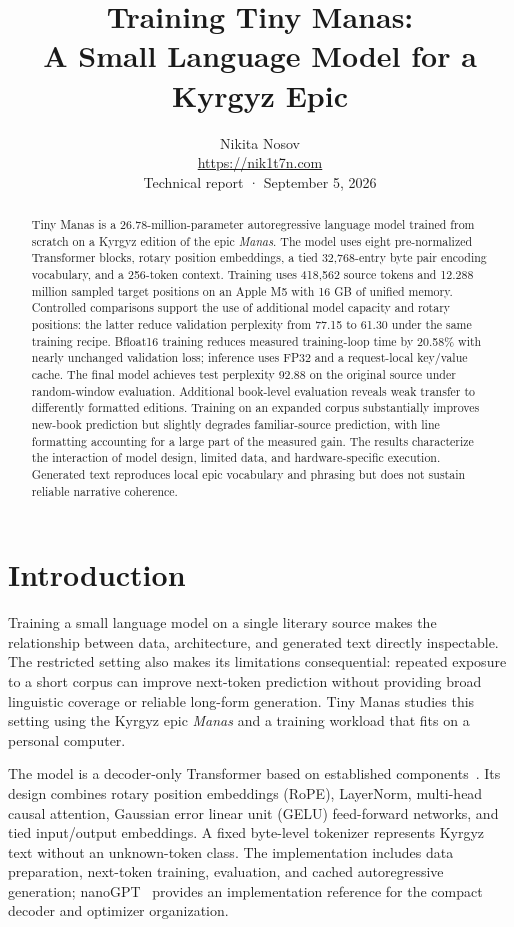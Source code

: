 \documentclass{article}
\title{Training Tiny Manas:\\A Small Language Model for a Kyrgyz Epic}
\author{Nikita Nosov\\\url{https://nik1t7n.com}\\\small Technical report · September 5, 2026}
\date{}
\begin{document}
\maketitle

\begin{abstract}
Tiny Manas is a 26.78-million-parameter autoregressive language model trained from scratch on a Kyrgyz edition of the epic \emph{Manas}. The model uses eight pre-normalized Transformer blocks, rotary position embeddings, a tied 32,768-entry byte pair encoding vocabulary, and a 256-token context. Training uses 418,562 source tokens and 12.288 million sampled target positions on an Apple M5 with 16 GB of unified memory. Controlled comparisons support the use of additional model capacity and rotary positions: the latter reduce validation perplexity from 77.15 to 61.30 under the same training recipe. Bfloat16 training reduces measured training-loop time by 20.58\% with nearly unchanged validation loss; inference uses FP32 and a request-local key/value cache. The final model achieves test perplexity 92.88 on the original source under random-window evaluation. Additional book-level evaluation reveals weak transfer to differently formatted editions. Training on an expanded corpus substantially improves new-book prediction but slightly degrades familiar-source prediction, with line formatting accounting for a large part of the measured gain. The results characterize the interaction of model design, limited data, and hardware-specific execution. Generated text reproduces local epic vocabulary and phrasing but does not sustain reliable narrative coherence.
\end{abstract}

\section{Introduction}
Training a small language model on a single literary source makes the relationship between data, architecture, and generated text directly inspectable. The restricted setting also makes its limitations consequential: repeated exposure to a short corpus can improve next-token prediction without providing broad linguistic coverage or reliable long-form generation. Tiny Manas studies this setting using the Kyrgyz epic \emph{Manas} and a training workload that fits on a personal computer.

The model is a decoder-only Transformer based on established components~\cite{attention,gpt2}. Its design combines rotary position embeddings (RoPE), LayerNorm, multi-head causal attention, Gaussian error linear unit (GELU) feed-forward networks, and tied input/output embeddings. A fixed byte-level tokenizer represents Kyrgyz text without an unknown-token class. The implementation includes data preparation, next-token training, evaluation, and cached autoregressive generation; nanoGPT~\cite{nanogpt} provides an implementation reference for the compact decoder and optimizer organization.
\end{document}
